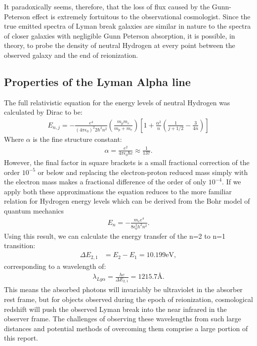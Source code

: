 		It paradoxically seems, therefore, that the loss of flux caused by the Gunn-Peterson effect is extremely fortuitous to the observational cosmologist. Since the true emitted spectra of Lyman break galaxies are similar in nature to the spectra of closer galaxies with negligible Gunn Peterson absorption, it is possible, in theory, to probe the density of neutral Hydrogen at every point between the observed galaxy and the end of reionization.

	\subsection{Properties of the Lyman Alpha line} %
	\label{sub:properties_of_the_lyman_alpha_line}
		The full relativistic equation for the energy levels of neutral Hydrogen was calculated by Dirac to be:
		\begin{align}
			E_{n,j} = - \frac{e^4}{ (4 \pi \epsilon_0)^2 2 \hbar^2 n^2} \left( \frac{m_p m_e}{m_p + m_e} \right) %
				\left [ 1 + \frac{\alpha^2}{n} \left( \frac{1}{j+1/2} - \frac{3}{4n} \right) \right]
		\end{align}
		Where $\alpha$ is the fine structure constant:
		\begin{align}
			\alpha = \frac{e^2}{4 \pi \epsilon_0 \hbar c}  \approx \frac{1}{137}.
		\end{align}
		However, the final factor in square brackets is a small fractional correction of the order $10^{-5}$ or below and replacing the electron-proton reduced mass simply with the electron mass makes a fractional difference of the order of only $10^{-4}$. If we apply both these approximations the equation reduces to the more familiar relation for Hydrogen energy levels which can be derived from the Bohr model of quantum mechanics
		\begin{align}
			E_n = - \frac{m_e e^4}{8 \epsilon_0^2 h^2 n^2}.
		\end{align}
		Using this result, we can calculate the energy transfer of the n=2 to n=1 transition:
		\begin{align}
			\Delta E_{2,1} &= E_2 - E_1 = 10.199\si{\electronvolt} ,
		\end{align}
		corresponding to a wavelength of:
		\begin{align}
			\lambda_{Ly\alpha} = \frac{hc}{\Delta E_{2,1}} = 1215.7 \si{\angstrom}.
		\end{align}
		This means the absorbed photons will invariably be ultraviolet in the absorber rest frame, but for objects observed during the epoch of reionization, cosmological redshift will push the observed Lyman break into the near infrared in the observer frame. The challenges of observing these wavelengths from such large distances and potential methods of overcoming them comprise a large portion of this report.

